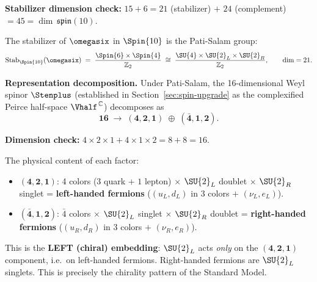 \medskip
\noindent\textbf{Stabilizer dimension check:}
$15 + 6 = 21$ (stabilizer) $+$ $24$ (complement) $= 45 = \dim\,\mathfrak{spin}(10)$.\ \checkmark

\begin{proposition}\label{prop:pati-salam}
The stabilizer of $\omegasix$ in $\Spin{10}$ is the Pati-Salam group:
\begin{equation}\label{eq:PS-stab}
  \mathrm{Stab}_{\Spin{10}}(\omegasix)
  \;=\;
  \frac{\Spin{6}\times\Spin{4}}{\mathbb{Z}_2}
  \;\cong\;
  \frac{\SU{4}\times\SU{2}_L\times\SU{2}_R}{\mathbb{Z}_2},
  \qquad \dim = 21.
\end{equation}
\end{proposition}

\noindent\textbf{Representation decomposition.}
Under Pati-Salam, the 16-dimensional Weyl spinor $\Stenplus$
(established in Section~\ref{sec:spin-upgrade} as the complexified
Peirce half-space $\Vhalf^{\,\mathbb{C}}$) decomposes as
\begin{equation}\label{eq:16-PS}
  \mathbf{16}
  \;\to\;
  (\mathbf{4},\mathbf{2},\mathbf{1})
  \;\oplus\;
  (\bar{\mathbf{4}},\mathbf{1},\mathbf{2}).
\end{equation}

\noindent\textbf{Dimension check:}
$4\times 2\times 1 + 4\times 1\times 2 = 8 + 8 = 16$.\ \checkmark

\medskip
The physical content of each factor:
\begin{itemize}
  \item $(\mathbf{4},\mathbf{2},\mathbf{1})$:
    4 colors ($3$ quark + $1$ lepton) $\times$ $\SU{2}_L$ doublet $\times$
    $\SU{2}_R$ singlet = \textbf{left-handed fermions}
    ($(u_L,d_L)$ in 3 colors $+$ $(\nu_L,e_L)$).
  \item $(\bar{\mathbf{4}},\mathbf{1},\mathbf{2})$:
    $\bar{4}$ colors $\times$ $\SU{2}_L$ singlet $\times$ $\SU{2}_R$ doublet
    = \textbf{right-handed fermions}
    ($(u_R,d_R)$ in 3 colors $+$ $(\nu_R,e_R)$).
\end{itemize}

This is the \textbf{LEFT (chiral) embedding}: $\SU{2}_L$ acts
\emph{only} on the $(\mathbf{4},\mathbf{2},\mathbf{1})$ component,
i.e.\ on left-handed fermions.  Right-handed fermions are $\SU{2}_L$
singlets.  This is precisely the chirality pattern of the Standard
Model.

